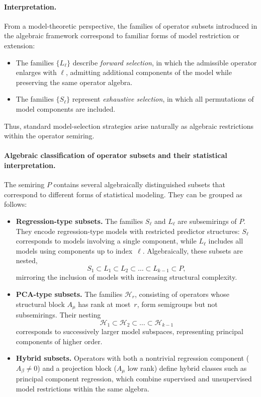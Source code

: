 \paragraph{Interpretation.}
From a model-theoretic perspective, the families of operator subsets introduced in the algebraic framework correspond to familiar forms of model restriction or extension:
\begin{itemize}
  \item The families $\{L_\ell\}$ describe \emph{forward selection}, in which the admissible operator enlarges with $\ell$, admitting additional components of the model while preserving the same operator algebra.
  \item The families $\{S_\ell\}$ represent \emph{exhaustive selection}, in which all permutations of model components are included.
\end{itemize}
Thus, standard model-selection strategies arise naturally as algebraic restrictions within the operator semiring.

\paragraph{Algebraic classification of operator subsets and their statistical interpretation.}
The semiring $P$ contains several algebraically distinguished subsets that correspond to different forms of statistical modeling. They can be grouped as follows:
\begin{itemize}
  \item \textbf{Regression-type subsets.}
  The families $S_\ell$ and $L_\ell$ are subsemirings of $P$. They encode regression-type models with restricted predictor structures: $S_\ell$ corresponds to models involving a single component, while $L_\ell$ includes all models using components up to index~$\ell$. Algebraically, these subsets are nested,
  \[
      S_1 \subset L_1 \subset L_2 \subset \dots \subset L_{k-1} \subset P,
  \]
  mirroring the inclusion of models with increasing structural complexity.

  \item \textbf{PCA-type subsets.}
  The families $\mathcal{H}_r$, consisting of operators whose structural block $A_\mu$ has rank at most~$r$, form semigroups but not subsemirings. Their nesting
  \[
      \mathcal{H}_1 \subset \mathcal{H}_2 \subset \dots \subset \mathcal{H}_{k-1}
  \]
  corresponds to successively larger model subspaces, representing principal components of higher order.

  \item \textbf{Hybrid subsets.}
  Operators with both a nontrivial regression component ($A_\beta \neq 0$) and a projection block ($A_\mu$ low rank) define hybrid classes such as principal component regression, which combine supervised and unsupervised model restrictions within the same algebra.
\end{itemize}

